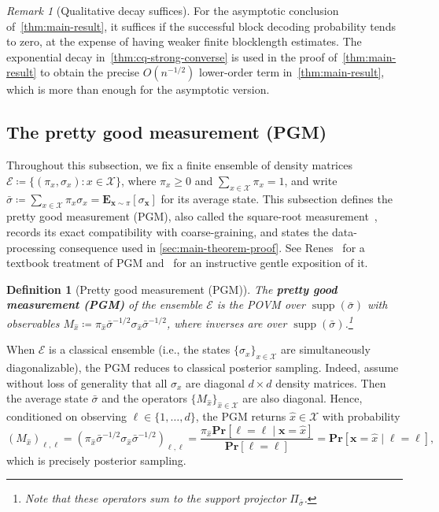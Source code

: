 \documentclass[11pt]{article}
\renewcommand{\geq}{\geqslant}
\newtheorem{definition}{Definition}[section]
\theoremstyle{remark}
\newtheorem{remark}{Remark}[section]
\newcommand*\Bell{\ensuremath{\boldsymbol\ell}}
\newcommand{\cX}{\mathcal{X}}
\newcommand{\cE}{\mathcal{E}}
\newcommand{\supp}{\operatorname{supp}}
\newcommand{\Eb}{\mathbf{E}}
\newcommand{\Prb}{\mathbf{Pr}}
\newcommand{\bx}{\mathbf{x}}
\begin{document}
\begin{remark}[Qualitative decay suffices]
\label{rem:qualitative-decay-suffices}
For the asymptotic conclusion of~\cref{thm:main-result}, it suffices if the successful block decoding probability tends to zero, at the expense of having weaker finite blocklength estimates. The exponential decay in~\cref{thm:cq-strong-converse} is used in the proof of~\cref{thm:main-result} to obtain the precise $O(n^{-1/2})$ lower-order term in~\cref{thm:main-result}, which is more than enough for the asymptotic version.
\end{remark}

\subsection{The pretty good measurement (PGM)}
\label{subsec:pgm-definition}

Throughout this subsection, we fix a finite ensemble of density matrices $\cE \coloneqq \{(\pi_x,\sigma_x) : x \in \cX\}$, where $\pi_x \geq 0$ and $\sum_{x \in \cX}{\pi_x} = 1$, and write $\bar{\sigma} \coloneqq \sum_{x \in \cX}{\pi_x \sigma_x} = \Eb_{\bx \sim \pi}[\sigma_{\bx}]$ for its average state. This subsection defines the pretty good measurement (PGM), also called the square-root measurement~\cite{Bel75,Hol79,HW94,HJSWW96}, records its exact compatibility with coarse-graining, and states the data-processing consequence used in \cref{sec:main-theorem-proof}. See Renes~\cite[Section~11.5]{Ren22} for a textbook treatment of PGM and~\cite[Lectures~6~and~7]{Wri24} for an instructive gentle exposition of it.

\begin{definition}[Pretty good measurement (PGM)]
\label{def:pgm}
The \textbf{pretty good measurement (PGM)} of the ensemble $\cE$ is the POVM over $\supp(\bar{\sigma})$ with observables $M_{\hat{x}} \coloneqq \pi_{\hat{x}}\bar{\sigma}^{-1/2}\sigma_{\hat{x}}\bar{\sigma}^{-1/2}$, where inverses are over $\supp(\bar{\sigma})$.\footnote{Note that these operators sum to the support projector $\Pi_{\bar{\sigma}}$.}
\end{definition}

When $\cE$ is a classical ensemble (i.e., the states $\{\sigma_x\}_{x \in \cX}$ are simultaneously diagonalizable), the PGM reduces to classical posterior sampling. Indeed, assume without loss of generality that all $\sigma_x$ are diagonal $d \times d$ density matrices. Then the average state $\bar{\sigma}$ and the operators $\{M_{\hat{x}}\}_{\hat{x} \in \cX}$ are also diagonal. Hence, conditioned on observing $\ell \in \{1, \ldots , d\}$, the PGM returns $\hat{x} \in \cX$ with probability
\begin{equation*}
(M_{\hat{x}})_{\ell,\ell} = (\pi_{\hat{x}}\bar{\sigma}^{-1/2}\sigma_{\hat{x}}\bar{\sigma}^{-1/2})_{\ell,\ell} = \frac{\pi_{\hat{x}} \Prb[\Bell = \ell \mid \bx = \hat{x}]}{\Prb[\Bell = \ell]} = \Prb[\bx = \hat{x} \mid \Bell = \ell],
\end{equation*}
which is precisely posterior sampling.
\end{document}
